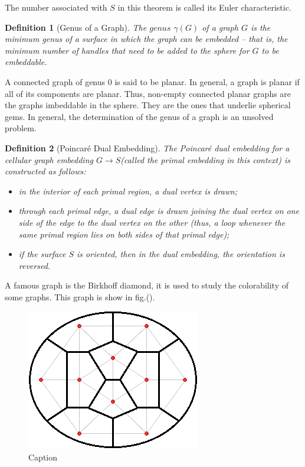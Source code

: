 \documentclass[10pt]{article}
\newtheorem{definition}{Definition}
\begin{document}
The number associated with $S$ in this theorem is called its Euler characteristic.

\begin{definition} [Genus of a Graph]
The $genus$ $\gamma(G)$ of a graph $G$ is the minimum genus of a surface in which the graph can be embedded – that is, the minimum number of handles that need to be added to the sphere for $G$ to be embeddable.
\end{definition}

A connected graph of genus 0 is said to be planar. In general, a graph is planar if all of its components are planar. Thus, non-empty connected planar graphs are the graphs imbeddable in the sphere. They are the ones that underlie spherical gems. In general, the determination of the genus of a graph is  an unsolved problem. 

\begin{definition}[Poincar\'e Dual Embedding]
The \emph{Poincar\'e dual embedding} for a cellular graph embedding $G\xrightarrow{}S$(called \emph{the primal embedding} in this context) is constructed as follows:
    \begin{itemize}
        \item in the interior of each primal region, a \emph{dual vertex} is drawn;
        \item through each primal edge, a \emph{dual edge} is drawn joining the dual vertex on one side of the edge to the dual vertex on the other (thus, a loop whenever the same primal region lies on both sides of that primal edge);
        \item if the surface $S$ is oriented, then in the dual embedding, the orientation is reversed.
    \end{itemize}
\end{definition}

A famous graph is the Birkhoff diamond, it is used to study the colorability of some graphs\cite{tilley2018birkhoff}. This graph is show in fig.().

\begin{figure}[H]
    \centering
		\includegraphics[scale=0.75]{images/Birkhoff_diamond.png}
    \caption{Caption}
    \label{fig:my_label}
\end{figure}
\end{document}
